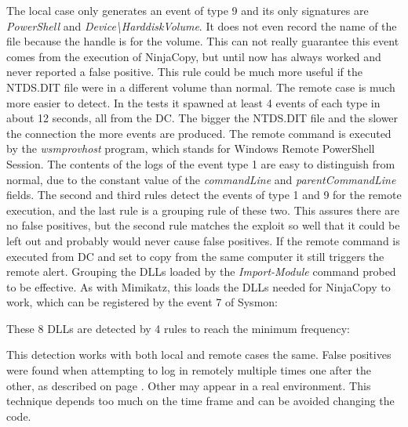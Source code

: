 \linej

\linej
The local case only generates an event of type 9 and its only signatures are \textit{PowerShell} and \textit{Device{\textbackslash}HarddiskVolume}. It does not even record the name of the file because the handle is for the volume. This can not really guarantee this event comes from the execution of NinjaCopy, but until now has always worked and never reported a false positive. This rule could be much more useful if the NTDS.DIT file were in a different volume than normal.
\linej
\linej
The remote case is much more easier to detect. In the tests it spawned at least 4 events of each type in about 12 seconds, all from the DC.
The bigger the NTDS.DIT file and the slower the connection the more events are produced.
\linej
The remote command is executed by the \textit{wsmprovhost} program, which stands for Windows Remote PowerShell Session.
The contents of the logs of the event type 1 are easy to distinguish from normal, due to the constant value of the \textit{commandLine} and \textit{parentCommandLine} fields.
\linej
The second and third rules detect the events of type 1 and 9 for the remote execution, and the last rule is a grouping rule of these two. This assures there are no false positives, but the second rule matches the exploit so well that it could be left out and probably would never cause false positives.
\linej
If the remote command is executed from DC and set to copy from the same computer it still triggers the remote alert.
\linej
\linej
Grouping the DLLs loaded by the \textit{Import-Module} command probed to be effective. As with Mimikatz, this loads the DLLs needed for NinjaCopy to work, which can be registered by the event 7 of Sysmon:

\linej
These 8 DLLs are detected by 4 rules to reach the minimum frequency:

\linej
This detection works with both local and remote cases the same.
\linej
False positives were found when attempting to log in remotely multiple times one after the other, as described on page \pageref{reverse_login}.
Other may appear in a real environment.
This technique depends too much on the time frame and can be avoided changing the code.

